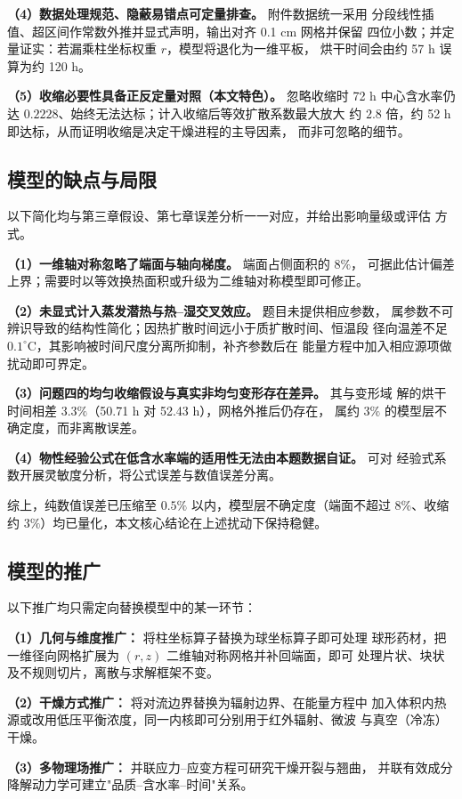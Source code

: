 \documentclass[12pt,a4paper]{article}
\begin{document}
\begin{center}
\textbf{（4）数据处理规范、隐蔽易错点可定量排查。} 附件数据统一采用
分段线性插值、超区间作常数外推并显式声明，输出对齐 0.1 cm 网格并保留
四位小数；并定量证实：若漏乘柱坐标权重 $r$，模型将退化为一维平板，
烘干时间会由约 57 h 误算为约 120 h。

\textbf{（5）收缩必要性具备正反定量对照（本文特色）。} 忽略收缩时 72 h
中心含水率仍达 $0.2228$、始终无法达标；计入收缩后等效扩散系数最大放大
约 $2.8$ 倍，约 52 h 即达标，从而证明收缩是决定干燥进程的主导因素，
而非可忽略的细节。

\subsection{模型的缺点与局限}
以下简化均与第三章假设、第七章误差分析一一对应，并给出影响量级或评估
方式。

\textbf{（1）一维轴对称忽略了端面与轴向梯度。} 端面占侧面积的 $8\%$，
可据此估计偏差上界；需要时以等效换热面积或升级为二维轴对称模型即可修正。

\textbf{（2）未显式计入蒸发潜热与热--湿交叉效应。} 题目未提供相应参数，
属参数不可辨识导致的结构性简化；因热扩散时间远小于质扩散时间、恒温段
径向温差不足 $0.1^\circ$C，其影响被时间尺度分离所抑制，补齐参数后在
能量方程中加入相应源项做扰动即可界定。

\textbf{（3）问题四的均匀收缩假设与真实非均匀变形存在差异。} 其与变形域
解的烘干时间相差 $3.3\%$（50.71 h 对 52.43 h），网格外推后仍存在，
属约 $3\%$ 的模型层不确定度，而非离散误差。

\textbf{（4）物性经验公式在低含水率端的适用性无法由本题数据自证。} 可对
经验式系数开展灵敏度分析，将公式误差与数值误差分离。

综上，纯数值误差已压缩至 $0.5\%$ 以内，模型层不确定度（端面不超过
$8\%$、收缩约 $3\%$）均已量化，本文核心结论在上述扰动下保持稳健。

\subsection{模型的推广}
以下推广均只需定向替换模型中的某一环节：

\textbf{（1）几何与维度推广：} 将柱坐标算子替换为球坐标算子即可处理
球形药材，把一维径向网格扩展为 $(r,z)$ 二维轴对称网格并补回端面，即可
处理片状、块状及不规则切片，离散与求解框架不变。

\textbf{（2）干燥方式推广：} 将对流边界替换为辐射边界、在能量方程中
加入体积内热源或改用低压平衡浓度，同一内核即可分别用于红外辐射、微波
与真空（冷冻）干燥。

\textbf{（3）多物理场推广：} 并联应力--应变方程可研究干燥开裂与翘曲，
并联有效成分降解动力学可建立"品质--含水率--时间"关系。


\end{center}
\end{document}
